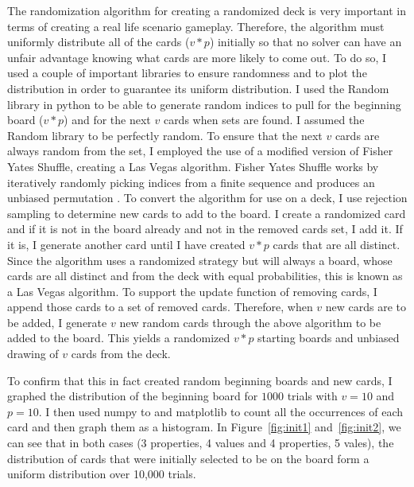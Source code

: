\documentclass[pageno]{jpaper}
\begin{document}
The randomization algorithm for creating a randomized deck is very important in terms of creating a real life scenario gameplay. Therefore, the algorithm must uniformly distribute all of the cards ($v*p$) initially so that no solver can have an unfair advantage knowing what cards are more likely to come out. To do so, I used a couple of important libraries to ensure randomness and to plot the distribution in order to guarantee its uniform distribution. I used the Random library in python to be able to generate random indices to pull for the beginning board ($v*p$) and for the next $v$ cards when sets are found. I assumed the Random library to be perfectly random. To ensure that the next $v$ cards are always random from the set, I employed the use of a modified version of Fisher Yates Shuffle, creating a Las Vegas algorithm. Fisher Yates Shuffle works by iteratively randomly picking indices from a finite sequence and produces an unbiased permutation \cite{fisher}. To convert the algorithm for use on a deck, I use rejection sampling to determine new cards to add to the board. I create a randomized card and if it is not in the board already and not in the removed cards set, I add it. If it is, I generate another card until I have created $v*p$ cards that are all distinct. Since the algorithm uses a randomized strategy but will always a board, whose cards are all distinct and from the deck with equal probabilities, this is known as a Las Vegas algorithm. To support the update function of removing cards, I append those cards to a set of removed cards. Therefore, when $v$ new cards are to be added, I generate $v$ new random cards through the above algorithm to be added to the board. This yields a randomized $v*p$ starting boards and unbiased drawing of $v$ cards from the deck.

To confirm that this in fact created random beginning boards and new cards, I graphed the distribution of the beginning board for $1000$ trials with $v = 10$ and $p = 10$. I then used numpy to and matplotlib to count all the occurrences of each card and then graph them as a histogram. In Figure~\ref{fig:init1}  and~\ref{fig:init2}, we can see that in both cases (3 properties, 4 values and 4 properties, 5 vales), the distribution of cards that were initially selected to be on the board form a uniform distribution over 10,000 trials.
\end{document}
